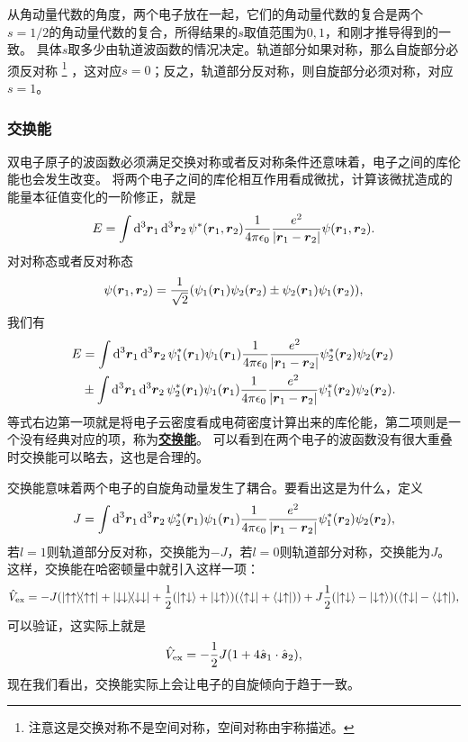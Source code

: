 \documentclass[UTF8, a4paper]{ctexart}
\newcommand*{\concept}[1]{\underline{\textbf{#1}}}
\begin{document}
从角动量代数的角度，两个电子放在一起，它们的角动量代数的复合是两个$s=1/2$的角动量代数的复合，所得结果的$s$取值范围为$0, 1$，和刚才推导得到的一致。
具体$s$取多少由轨道波函数的情况决定。轨道部分如果对称，那么自旋部分必须反对称%
\footnote{注意这是交换对称不是空间对称，空间对称由宇称描述。}%
，这对应$s=0$；反之，轨道部分反对称，则自旋部分必须对称，对应$s=1$。

\subsubsection{交换能}

双电子原子的波函数必须满足交换对称或者反对称条件还意味着，电子之间的库伦能也会发生改变。
将两个电子之间的库伦相互作用看成微扰，计算该微扰造成的能量本征值变化的一阶修正，就是
\begin{equation}
    E = \int \dd[3]{\vb*{r}_1} \dd[3]{\vb*{r}_2} \psi^*(\vb*{r}_1, \vb*{r}_2) \frac{1}{4\pi \epsilon_0} \frac{e^2}{\abs{\vb*{r}_1 - \vb*{r}_2}} \psi(\vb*{r}_1, \vb*{r}_2).
\end{equation}
对对称态或者反对称态
\[
    \psi(\vb*{r}_1, \vb*{r}_2) = \frac{1}{\sqrt{2}} (\psi_1(\vb*{r}_1) \psi_2(\vb*{r}_2) \pm \psi_2(\vb*{r}_1) \psi_1(\vb*{r}_2)),
\]
我们有
\begin{equation}
    \begin{aligned}
        E &= \int \dd[3]{\vb*{r}_1} \dd[3]{\vb*{r}_2} \psi_1^*(\vb*{r}_1) \psi_1(\vb*{r}_1) \frac{1}{4\pi \epsilon_0} \frac{e^2}{\abs{\vb*{r}_1 - \vb*{r}_2}} \psi_2^*(\vb*{r}_2) \psi_2(\vb*{r}_2) \\
        &\pm \int \dd[3]{\vb*{r}_1} \dd[3]{\vb*{r}_2} \psi_2^*(\vb*{r}_1) \psi_1(\vb*{r}_1) \frac{1}{4\pi \epsilon_0} \frac{e^2}{\abs{\vb*{r}_1 - \vb*{r}_2}} \psi_1^*(\vb*{r}_2) \psi_2(\vb*{r}_2).
    \end{aligned}
\end{equation}
等式右边第一项就是将电子云密度看成电荷密度计算出来的库伦能，第二项则是一个没有经典对应的项，称为\concept{交换能}。
可以看到在两个电子的波函数没有很大重叠时交换能可以略去，这也是合理的。

交换能意味着两个电子的自旋角动量发生了耦合。要看出这是为什么，定义
\begin{equation}
    J = \int \dd[3]{\vb*{r}_1} \dd[3]{\vb*{r}_2} \psi_2^*(\vb*{r}_1) \psi_1(\vb*{r}_1) \frac{1}{4\pi \epsilon_0} \frac{e^2}{\abs{\vb*{r}_1 - \vb*{r}_2}} \psi_1^*(\vb*{r}_2) \psi_2(\vb*{r}_2),
\end{equation}
若$l=1$则轨道部分反对称，交换能为$-J$，若$l=0$则轨道部分对称，交换能为$J$。这样，交换能在哈密顿量中就引入这样一项：
\[
    \hat{V}_\text{ex} = -J ( \dyad{\uparrow \uparrow} + \dyad{\downarrow \downarrow} + \frac{1}{2} (\ket{\uparrow \downarrow} + \ket{\downarrow \uparrow}) (\bra{\uparrow \downarrow} + \bra{\downarrow \uparrow}) ) + J \frac{1}{2} (\ket{\uparrow \downarrow} - \ket{\downarrow \uparrow}) (\bra{\uparrow \downarrow} - \bra{\downarrow \uparrow}),
\]
可以验证，这实际上就是
\begin{equation}
    \hat{V}_\text{ex} = - \frac{1}{2} J (1 + 4 \hat{\vb*{s}}_1 \cdot \hat{\vb*{s}}_2),
\end{equation}
现在我们看出，交换能实际上会让电子的自旋倾向于趋于一致。
\end{document}
